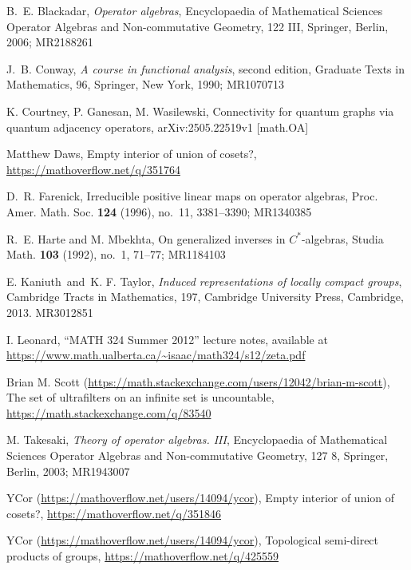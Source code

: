\documentclass[twoside,a4paper,12pt]{article}
\theoremstyle{plain}
\theoremstyle{definition}
\begin{document}
\begin{thebibliography}{aa}

 B.~E. Blackadar, {\it Operator algebras}, Encyclopaedia of Mathematical Sciences Operator Algebras and Non-commutative Geometry, 122 III, Springer, Berlin, 2006; MR2188261

 J.~B. Conway, {\it A course in functional analysis}, second edition, 
Graduate Texts in Mathematics, 96, Springer, New York, 1990; MR1070713

 K. Courtney, P. Ganesan, M. Wasilewski, Connectivity for quantum graphs via quantum adjacency operators, arXiv:2505.22519v1 [math.OA]

 Matthew Daws, Empty interior of union of cosets?, 
   \url{https://mathoverflow.net/q/351764}

 D.~R. Farenick, Irreducible positive linear maps on operator algebras, Proc. Amer. Math. Soc. {\bf 124} (1996), no.~11, 3381--3390; MR1340385

 R.~E. Harte and M. Mbekhta, On generalized inverses in $C^*$-algebras, Studia Math. {\bf 103} (1992), no.~1, 71--77; MR1184103

 E. Kaniuth\ and\ K. F. Taylor, {\it Induced representations of locally compact groups}, Cambridge Tracts in Mathematics, 197, Cambridge University Press, Cambridge, 2013. MR3012851

 I. Leonard, ``MATH 324 Summer 2012'' lecture notes, available at \url{https://www.math.ualberta.ca/~isaac/math324/s12/zeta.pdf}

 Brian M. Scott (\url{https://math.stackexchange.com/users/12042/brian-m-scott}), The set of ultrafilters on an infinite set is uncountable, \url{https://math.stackexchange.com/q/83540}

 M. Takesaki, {\it Theory of operator algebras. III}, Encyclopaedia of Mathematical Sciences Operator Algebras and Non-commutative Geometry, 127 8, Springer, Berlin, 2003; MR1943007

 YCor (\url{https://mathoverflow.net/users/14094/ycor}), Empty interior of union of cosets?,
   \url{https://mathoverflow.net/q/351846}

 YCor (\url{https://mathoverflow.net/users/14094/ycor}), Topological semi-direct products of groups,
   \url{https://mathoverflow.net/q/425559}

\end{thebibliography}
\end{document}
